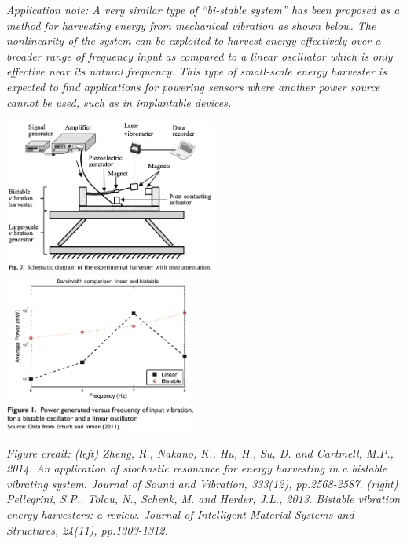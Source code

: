 \documentclass[12pt,letterpaper,english]{article}
\begin{document}
\vspace{0.5 in}


{\it \small Application note: A very similar type of ``bi-stable system'' has been proposed as a method for harvesting energy from mechanical vibration as shown below. The nonlinearity of the system can be exploited to harvest energy effectively over a broader range of frequency input as compared to a linear oscillator which is only effective near its natural frequency.  This type of small-scale energy harvester is expected to find applications for powering sensors where another power source cannot be used, such as in implantable devices.}

\begin{center}
\includegraphics[width=2.75in]{harvest.png}
\includegraphics[width=2.5in]{data.png}
\end{center}

{\it \scriptsize	 Figure credit: (left) Zheng, R., Nakano, K., Hu, H., Su, D. and Cartmell, M.P., 2014. An application of stochastic resonance for energy harvesting in a bistable vibrating system. Journal of Sound and Vibration, 333(12), pp.2568-2587.  (right) Pellegrini, S.P., Tolou, N., Schenk, M. and Herder, J.L., 2013. Bistable vibration energy harvesters: a review. Journal of Intelligent Material Systems and Structures, 24(11), pp.1303-1312. }
\end{document}
